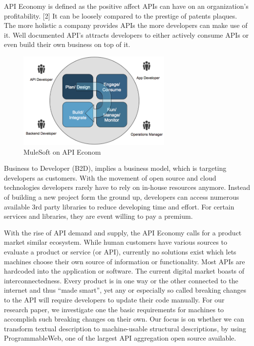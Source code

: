 \documentclass[a4paper]{IEEEtran}
\begin{document}
API Economy is defined as the positive affect APIs can have on an organization’s profitability. [2]
It can be loosely compared to the prestige of patents plaques. The more holistic a company provides APIs the more developers can make use of it. Well documented API’s attracts developers to either actively consume APIs or even build their own business on top of it.

\begin{figure}[!t]
\centering
\includegraphics[width= 3in]{img/APIcycle.png}
\caption{MuleSoft on API Econom}
\label{fig_sim}
\end{figure}

Business to Developer (B2D), implies a business model, which is targeting developers as customers. With the movement of open source and cloud technologies developers rarely have to rely on in-house resources anymore. Instead of building a new project form the ground up, developers can access numerous available 3rd party libraries to reduce developing time and effort. For certain services and libraries, they are event willing to pay a premium.

With the rise of API demand and supply, the API Economy calls for a product market similar ecosystem. While human customers have various sources to evaluate a product or service (or API), currently no solutions exist which lets machines choose their own source of information or functionality. Most APIs are hardcoded into the application or software. The current digital market boasts of interconnectedness. Every product is in one way or the other connected to the internet and thus “made smart”, yet any or especially so called breaking changes to the API will require developers to update their code manually. 
For our research paper, we investigate one the basic requirements for machines to accomplish such breaking changes on their own. Our focus is on whether we can transform textual description to machine-usable structural descriptions, by using ProgrammableWeb, one of the largest API aggregation open source available.
\end{document}
